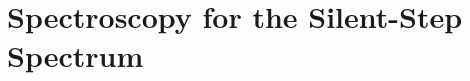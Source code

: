 \documentclass[
  a4paper,
]{report}
\theoremstyle{plain}
\theoremstyle{plain}
\theoremstyle{definition}
\theoremstyle{plain}
\theoremstyle{definition}
\theoremstyle{remark}
\begin{document}
\providecommand{\grammardef}{\;⩴\;}
\providecommand{\grammaror}{\;\mid\;}

\providecommand{\ccs}{\textsf{CCS}}
\providecommand{\ccschannels}{\mathcal{A}}
\providecommand{\ccsactions}{\actions_\ccs}
\providecommand{\ccslabels}{\labels_\ccs}
\providecommand{\coaction}[1]{\overline{#1}}
\providecommand{\ccsnames}{\mathcal X}
\providecommand{\ccsasg}{\mathcal V}
\providecommand{\ccsprefix}[1]{#1\ldotp\!}
\providecommand{\ccsnull}{\mathbf{0}}
\providecommand{\ccschoice}{+}
\providecommand{\ccspar}{\mid}
\providecommand{\ccsrestrict}{\setminus}

\providecommand{\hml}{\textsf{HML}}
\providecommand{\hmlobs}[1]{\langle #1 \rangle}
\providecommand{\hmland}[2]{\textstyle\bigwedge_{#1 \in #2}}
\providecommand{\hmlands}[1]{\textstyle\bigwedge #1}
\providecommand{\hmltrue}{\top}
\providecommand{\hmlneg}{\neg}

\providecommand{\semantics}[1]{\llbracket #1 \rrbracket}
\providecommand{\semanticsObs}[1]{\semantics{#1}^👁}
\providecommand{\difference}[2]{\Delta(#1,#2)}

\providecommand{\rel}[1]{\mathcal{#1}}

\providecommand{\bpreord}[1]{\preceq_\mathrm{#1}}
\providecommand{\nbpreord}[1]{\not\preceq_\mathrm{#1}}
\providecommand{\bpreordvar}[1]{\preceq_{#1}}
\providecommand{\beq}[1]{\sim_\mathrm{#1}}
\providecommand{\nbeq}[1]{\nsim_\mathrm{#1}}
\providecommand{\beqvar}[1]{\sim_{#1}}
\providecommand{\notions}{\mathbf{N}}
\providecommand{\observations}[1]{\mathcal{O}_\mathrm{#1}}
\providecommand{\observationsvar}[1]{\mathcal{O}_{#1}}

\providecommand{\gamemove}[1]{\mathrel{\smash{›\!\!\frac{#1}{}\!\!›}}}
\providecommand{\gamemoveblank}{\gamemove{\quad}}
\providecommand{\ngamemove}[1]{\mathrel{\smash{{›/\!\!\!\!\frac{#1}{\;}\!\!›}}}}
\providecommand{\ngamemoveblank}{\ngamemove{\quad}}
\providecommand{\game}{\mathcal{G}}
\providecommand{\attackerpos}[1]{{(#1)}_\mathtt{a}}
\providecommand{\defenderpos}[1]{{(#1)}_\mathtt{d}}
\providecommand{\attacker}{{\mathrm{a}}}
\providecommand{\defender}{{\mathrm{d}}}


\chapter{Spectroscopy for the Silent-Step
Spectrum}\label{spectroscopy-for-the-silent-step-spectrum}

\providecommand{\lc}[1]{}
\end{document}
